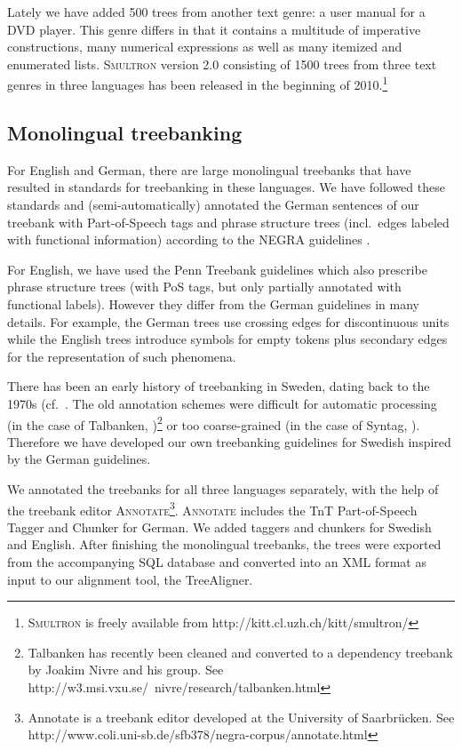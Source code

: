\documentclass[output=paper]{LSP/langsci}
\begin{document}
Lately we have added 500 trees from another text genre: a user manual for a DVD player. This genre differs in that it contains a multitude of imperative constructions, many numerical expressions as well as many itemized and enumerated lists. S\textsc{multron} version 2.0 consisting of 1500 trees from three text genres in three languages has been released in the beginning of 2010.\footnote{S\textsc{multron} is freely available from http://kitt.cl.uzh.ch/kitt/smultron/}

\subsection{Monolingual treebanking}\label{sec:volk:2.1}

For English and German, there are large monolingual treebanks that have resulted in standards for treebanking in these languages. We have followed these standards and (semi-automatically) annotated the German sentences of our treebank with Part-of-Speech tags and phrase structure trees (incl.~edges labeled with functional information) according to the NEGRA guidelines \citep{BrantsEtAl1997}. 

For English, we have used the Penn Treebank guidelines which also prescribe phrase structure trees (with PoS tags, but only partially annotated with functional labels). However they differ from the German guidelines in many details. For example, the German trees use crossing edges for discontinuous units while the English trees introduce symbols for empty tokens plus secondary edges for the representation of such phenomena. 

There has been an early history of treebanking in Sweden, dating back to the 1970s (cf.~\citealt{Nivre2002}. The old annotation schemes were difficult for automatic processing (in the case of Talbanken, \citealt{Teleman1974})\footnote{Talbanken has recently been cleaned and converted to a dependency treebank by Joakim Nivre and his group. See http://w3.msi.vxu.se/~nivre/research/talbanken.html} or too coarse-grained (in the case of Syntag, \citealt{Järborg1986}). Therefore we have developed our own treebanking guidelines for Swedish inspired by the German guidelines. 

We annotated the treebanks for all three languages separately, with the help of the treebank editor A\textsc{nnotate}\footnote{Annotate is a treebank editor developed at the University of Saarbrücken. See http://www.coli.uni-sb.de/sfb378/negra-corpus/annotate.html}. A\textsc{nnotate} includes the TnT Part-of-Speech Tagger and Chunker for German. We added taggers and chunkers for Swedish and English. After finishing the monolingual treebanks, the trees were exported from the accompanying SQL database and converted into an XML format as input to our alignment tool, the TreeAligner. 
\end{document}
